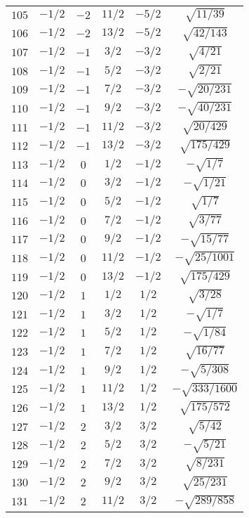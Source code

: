 \begin{table}
\begin{center}
\begin{tabular}{|c|c|c|c|c|c|}
$105$ & $-1/2$ & $-2$ & $11/2$ & $-5/2$ & $\sqrt{11/39}$ \\ 
$106$ & $-1/2$ & $-2$ & $13/2$ & $-5/2$ & $\sqrt{42/143}$ \\ 
$107$ & $-1/2$ & $-1$ & $3/2$ & $-3/2$ & $\sqrt{4/21}$ \\ 
$108$ & $-1/2$ & $-1$ & $5/2$ & $-3/2$ & $\sqrt{2/21}$ \\ 
$109$ & $-1/2$ & $-1$ & $7/2$ & $-3/2$ & $-\sqrt{20/231}$ \\ 
$110$ & $-1/2$ & $-1$ & $9/2$ & $-3/2$ & $-\sqrt{40/231}$ \\ 
$111$ & $-1/2$ & $-1$ & $11/2$ & $-3/2$ & $\sqrt{20/429}$ \\ 
$112$ & $-1/2$ & $-1$ & $13/2$ & $-3/2$ & $\sqrt{175/429}$ \\ 
$113$ & $-1/2$ & $0$ & $1/2$ & $-1/2$ & $-\sqrt{1/7}$ \\ 
$114$ & $-1/2$ & $0$ & $3/2$ & $-1/2$ & $-\sqrt{1/21}$ \\ 
$115$ & $-1/2$ & $0$ & $5/2$ & $-1/2$ & $\sqrt{1/7}$ \\ 
$116$ & $-1/2$ & $0$ & $7/2$ & $-1/2$ & $\sqrt{3/77}$ \\ 
$117$ & $-1/2$ & $0$ & $9/2$ & $-1/2$ & $-\sqrt{15/77}$ \\ 
$118$ & $-1/2$ & $0$ & $11/2$ & $-1/2$ & $-\sqrt{25/1001}$ \\ 
$119$ & $-1/2$ & $0$ & $13/2$ & $-1/2$ & $\sqrt{175/429}$ \\ 
$120$ & $-1/2$ & $1$ & $1/2$ & $1/2$ & $\sqrt{3/28}$ \\ 
$121$ & $-1/2$ & $1$ & $3/2$ & $1/2$ & $-\sqrt{1/7}$ \\ 
$122$ & $-1/2$ & $1$ & $5/2$ & $1/2$ & $-\sqrt{1/84}$ \\ 
$123$ & $-1/2$ & $1$ & $7/2$ & $1/2$ & $\sqrt{16/77}$ \\ 
$124$ & $-1/2$ & $1$ & $9/2$ & $1/2$ & $-\sqrt{5/308}$ \\ 
$125$ & $-1/2$ & $1$ & $11/2$ & $1/2$ & $-\sqrt{333/1600}$ \\ 
$126$ & $-1/2$ & $1$ & $13/2$ & $1/2$ & $\sqrt{175/572}$ \\ 
$127$ & $-1/2$ & $2$ & $3/2$ & $3/2$ & $\sqrt{5/42}$ \\ 
$128$ & $-1/2$ & $2$ & $5/2$ & $3/2$ & $-\sqrt{5/21}$ \\ 
$129$ & $-1/2$ & $2$ & $7/2$ & $3/2$ & $\sqrt{8/231}$ \\ 
$130$ & $-1/2$ & $2$ & $9/2$ & $3/2$ & $\sqrt{25/231}$ \\ 
$131$ & $-1/2$ & $2$ & $11/2$ & $3/2$ & $-\sqrt{289/858}$ \\ 

\end{tabular}
\end{center}
\end{table}
